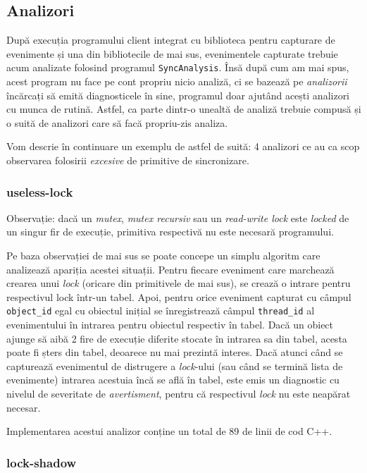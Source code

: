 \subsection{Analizori}\label{analyzers}

După execuția programului client integrat cu biblioteca pentru capturare
de evenimente și una din bibliotecile de mai sus, evenimentele capturate
trebuie acum analizate folosind programul \lstinline{SyncAnalysis}. Însă
după cum am mai spus, acest program nu face pe cont propriu nicio
analiză, ci se bazează pe \textit{analizorii} încărcați să emită
diagnosticele în sine, programul doar ajutând acești analizori cu munca
de rutină. Astfel, ca parte dintr-o unealtă de analiză trebuie compusă
și o suită de analizori care să facă propriu-zis analiza.

Vom descrie în continuare un exemplu de astfel de suită: 4 analizori ce
au ca scop observarea folosirii \textit{excesive} de primitive de
sincronizare.

\subsubsection{useless-lock}

Observație: dacă un \textit{mutex}, \textit{mutex recursiv} sau un
\textit{read-write lock} este \textit{locked} de un singur fir de
execuție, primitiva respectivă nu este necesară programului.

Pe baza observației de mai sus se poate concepe un simplu algoritm care
analizează apariția acestei situații. Pentru fiecare eveniment care
marchează crearea unui \textit{lock} (oricare din primitivele de mai
sus), se crează o intrare pentru respectivul lock într-un tabel. Apoi,
pentru orice eveniment capturat cu câmpul \lstinline{object_id} egal cu
obiectul inițial se înregistrează câmpul \lstinline{thread_id} al
evenimentului în intrarea pentru obiectul respectiv în tabel. Dacă un
obiect ajunge să aibă 2 fire de execuție diferite stocate în intrarea
sa din tabel, acesta poate fi șters din tabel, deoarece nu mai prezintă
interes. Dacă atunci când se capturează evenimentul de distrugere a
\textit{lock}-ului (sau când se termină lista de evenimente) intrarea
acestuia încă se află în tabel, este emis un diagnostic cu nivelul de
severitate de \textit{avertisment}, pentru că respectivul \textit{lock}
nu este neapărat necesar.

Implementarea acestui analizor conține un total de 89 de linii de cod
C++.

\subsubsection{lock-shadow}

